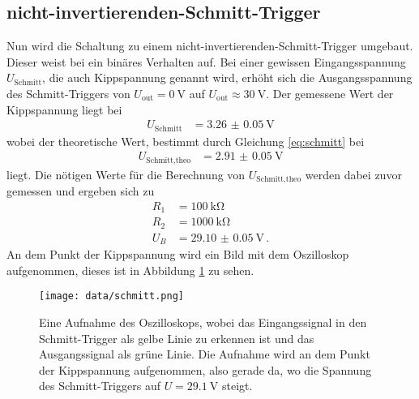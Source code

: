 \subsection{nicht-invertierenden-Schmitt-Trigger}
Nun wird die Schaltung zu einem nicht-invertierenden-Schmitt-Trigger umgebaut.
Dieser weist bei ein binäres Verhalten auf.
Bei einer gewissen Eingangsspannung $U_\text{Schmitt}$, die auch Kippspannung genannt wird, erhöht sich die Ausgangsspannung des Schmitt-Triggers von $U_\text{out}= \SI{0}{\V}$ auf $U_\text{out}\approx \SI{30}{\V}$.
Der gemessene Wert der Kippspannung liegt bei 
\begin{align*}
    U_\text{Schmitt} &= \SI{3.26(5)}{\V}
\end{align*}
wobei der theoretische Wert, bestimmt durch Gleichung \eqref{eq:schmitt} bei 
\begin{align*}
    U_\text{Schmitt,theo} &= \SI{2.91(5)}{\V}
\end{align*}
liegt.
Die nötigen Werte für die Berechnung von $ U_\text{Schmitt,theo}$ werden dabei zuvor gemessen und ergeben sich zu
\begin{align*}
    R_1 &= \SI{100}{\kilo\ohm}\\
    R_2 &= \SI{1000}{\kilo\ohm}\\
    U_B &= \SI{29.10(5)}{\V} \, .
\end{align*}
An dem Punkt der Kippspannung wird ein Bild mit dem Oszilloskop aufgenommen, dieses ist in Abbildung \ref{fig:schmitt_oszi} zu sehen.
\begin{figure}
    \centering
    \texttt{[image: data/schmitt.png]}
    \caption{Eine Aufnahme des Oszilloskops, wobei das Eingangssignal in den Schmitt-Trigger als gelbe Linie zu erkennen ist und das Ausgangssignal als grüne Linie.
    Die Aufnahme wird an dem Punkt der Kippspannung aufgenommen, also gerade da, wo die Spannung des Schmitt-Triggers auf $U=\SI{29.1}{\V}$ steigt.}
    \label{fig:schmitt_oszi}
\end{figure}
\FloatBarrier

